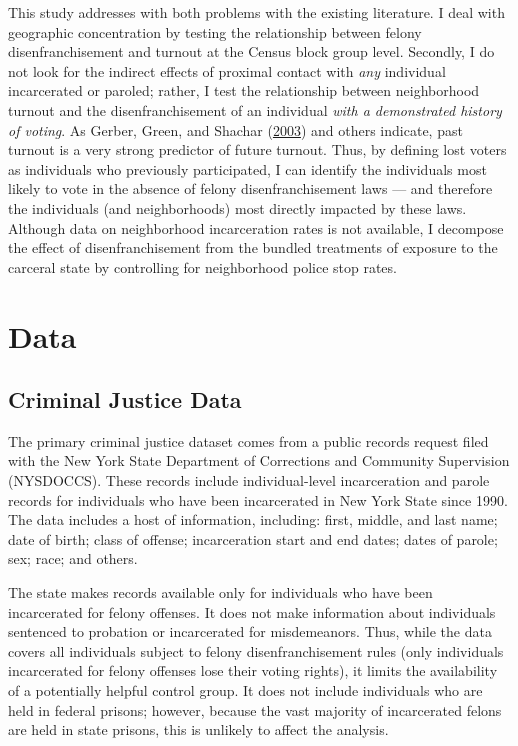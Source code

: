 \documentclass[
  12pt,
]{article}
\begin{document}
This study addresses with both problems with the existing literature. I deal with geographic concentration by testing the relationship between felony disenfranchisement and turnout at the Census block group level. Secondly, I do not look for the indirect effects of proximal contact with \emph{any} individual incarcerated or paroled; rather, I test the relationship between neighborhood turnout and the disenfranchisement of an individual \emph{with a demonstrated history of voting}. As Gerber, Green, and Shachar (\protect\hyperlink{ref-Gerber2003}{2003}) and others indicate, past turnout is a very strong predictor of future turnout. Thus, by defining lost voters as individuals who previously participated, I can identify the individuals most likely to vote in the absence of felony disenfranchisement laws --- and therefore the individuals (and neighborhoods) most directly impacted by these laws. Although data on neighborhood incarceration rates is not available, I decompose the effect of disenfranchisement from the bundled treatments of exposure to the carceral state by controlling for neighborhood police stop rates.

\hypertarget{data}{%
\section*{Data}\label{data}}

\hypertarget{criminal-justice-data}{%
\subsection*{Criminal Justice Data}\label{criminal-justice-data}}

The primary criminal justice dataset comes from a public records request filed with the New York State Department of Corrections and Community Supervision (NYSDOCCS). These records include individual-level incarceration and parole records for individuals who have been incarcerated in New York State since 1990. The data includes a host of information, including: first, middle, and last name; date of birth; class of offense; incarceration start and end dates; dates of parole; sex; race; and others.

The state makes records available only for individuals who have been incarcerated for felony offenses. It does not make information about individuals sentenced to probation or incarcerated for misdemeanors. Thus, while the data covers all individuals subject to felony disenfranchisement rules (only individuals incarcerated for felony offenses lose their voting rights), it limits the availability of a potentially helpful control group. It does not include individuals who are held in federal prisons; however, because the vast majority of incarcerated felons are held in state prisons, this is unlikely to affect the analysis.
\end{document}
